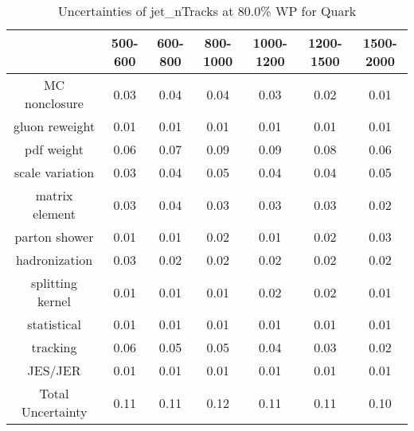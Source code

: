 \begin{table}
\centering
\caption{Uncertainties of jet_nTracks at 80.0\% WP for Quark}
\label{tab:syst_jet_nTracks_0.8_Quark}
\begin{tabular}{ccccccc}
\toprule
{} &  500-600 &  600-800 &  800-1000 &  1000-1200 &  1200-1500 &  1500-2000 \\
\midrule
MC nonclosure     &     0.03 &     0.04 &      0.04 &       0.03 &       0.02 &       0.01 \\
gluon reweight    &     0.01 &     0.01 &      0.01 &       0.01 &       0.01 &       0.01 \\
pdf weight        &     0.06 &     0.07 &      0.09 &       0.09 &       0.08 &       0.06 \\
scale variation   &     0.03 &     0.04 &      0.05 &       0.04 &       0.04 &       0.05 \\
matrix element    &     0.03 &     0.04 &      0.03 &       0.03 &       0.03 &       0.02 \\
parton shower     &     0.01 &     0.01 &      0.02 &       0.01 &       0.02 &       0.03 \\
hadronization     &     0.03 &     0.02 &      0.02 &       0.02 &       0.02 &       0.02 \\
splitting kernel  &     0.01 &     0.01 &      0.01 &       0.02 &       0.02 &       0.01 \\
statistical       &     0.01 &     0.01 &      0.01 &       0.01 &       0.01 &       0.01 \\
tracking          &     0.06 &     0.05 &      0.05 &       0.04 &       0.03 &       0.02 \\
JES/JER           &     0.01 &     0.01 &      0.01 &       0.01 &       0.01 &       0.01 \\
Total Uncertainty &     0.11 &     0.11 &      0.12 &       0.11 &       0.11 &       0.10 \\
\bottomrule
\end{tabular}
\end{table}
